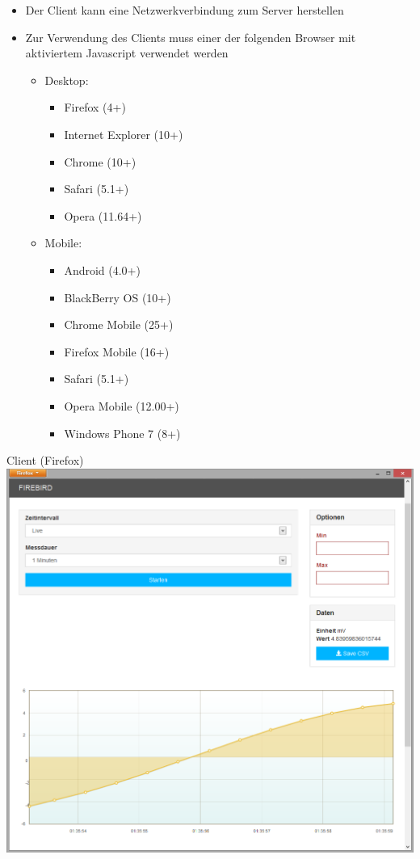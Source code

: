 \documentclass[11pt]{scrartcl}
\begin{document}
\begin{itemize}
	\item Der Client kann eine Netzwerkverbindung zum Server herstellen
	\item Zur Verwendung des Clients muss einer der folgenden Browser mit aktiviertem Javascript verwendet werden
	\begin{itemize}
		\item Desktop:	
		\begin{itemize}
			\item Firefox (4+)
			\item Internet Explorer (10+)
			\item Chrome (10+)
			\item Safari (5.1+)
			\item Opera (11.64+)
		\end{itemize}
		\item Mobile:	
		\begin{itemize}
			\item Android (4.0+)
			\item BlackBerry OS (10+)
			\item Chrome Mobile (25+)
			\item Firefox Mobile (16+)
			\item Safari (5.1+)
			\item Opera Mobile (12.00+)
			\item Windows Phone 7 (8+)
		\end{itemize}
	\end{itemize}
\end{itemize}

Client (Firefox)\\

\includegraphics[width=\textwidth]{Desktop}
\pagebreak
\end{document}

